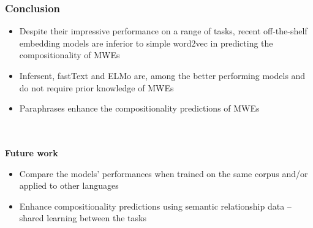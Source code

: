 \documentclass[english,svgnames,notes=hide,14pt,aspectratio=169]{beamer}
\begin{document}
\begin{frame}[fragile] %
\frametitle{Conclusion}
\begin{itemize}
    \item Despite their impressive performance on a range of tasks, recent off-the-shelf embedding models are inferior to simple word2vec in predicting the compositionality of MWEs
    \item Infersent, fastText and ELMo are, among the better performing models and do not require prior knowledge of MWEs
    \item Paraphrases enhance the compositionality predictions of MWEs
\end{itemize} \\~\\
\textbf{Future work} \\
\begin{itemize}
    \item Compare the models' performances when trained on the same corpus and/or applied to other languages
    \item Enhance compositionality predictions using semantic relationship data -- shared learning between the tasks
\end{itemize}
\end{frame}

\end{document}
